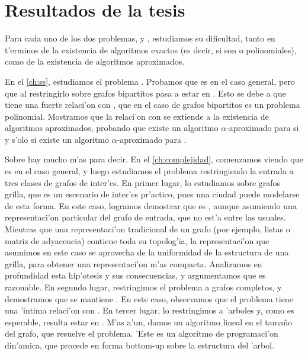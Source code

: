 \section{Resultados de la tesis}

Para cada uno de los dos problemas,  y , estudiamos su dificultad, tanto en t'erminos de la existencia de algoritmos exactos (es decir, si son  o polinomiales), como de la existencia de algoritmos aproximados.

En el \autoref{ch:ss}, estudiamos el problema . Probamos que es  en el caso general, pero que al restringirlo sobre grafos bipartitos pasa a estar en . Esto se debe a que  tiene una fuerte relaci'on con , que en el caso de grafos bipartitos es un problema polinomial. Mostramos que la relaci'on con  se extiende a la existencia de algoritmos aproximados, probando que existe un algoritmo $\alpha$-aproximado para  si y s'olo si existe un algoritmo $\alpha$-aproximado para .

Sobre  hay mucho m'as para decir. En el \autoref{ch:complejidad}, comenzamos viendo que es  en el caso general, y luego estudiamos el problema restringiendo la entrada a tres clases de grafos de inter'es. En primer lugar, lo estudiamos sobre grafos grilla, que es un escenario de inter'es pr'actico, pues una ciudad puede modelarse de esta forma. En este caso, logramos demostrar que es , aunque asumiendo una representaci'on particular del grafo de entrada, que no est'a entre las usuales. Mientras que una representaci'on tradicional de un grafo (por ejemplo, listas o matriz de adyacencia) contiene toda su topolog'ia, la representaci'on que asumimos en este caso se aprovecha de la uniformidad de la estructura de una grilla, para obtener una representaci'on m'as compacta. Analizamos en profundidad esta hip'otesis y sus consecuencias, y argumentamos que es razonable. En segundo lugar, restringimos el problema a grafos completos, y demostramos que se mantiene . En este caso, observamos que el problema tiene una 'intima relaci'on con . En tercer lugar, lo restringimos a 'arboles y, como es esperable, resulta estar en . M'as a'un, damos un algoritmo lineal en el tama\~no del grafo, que resuelve el problema. 'Este es un algoritmo de programaci'on din'amica, que procede en forma bottom-up sobre la estructura del 'arbol.


